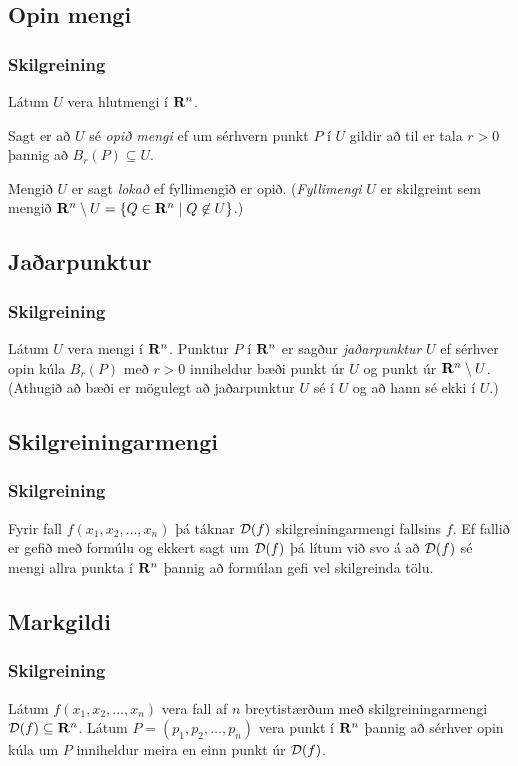  




\subsection{Opin mengi}
 \subsubsection{Skilgreining }
Látum $U$ vera hlutmengi í $\mbox{${\bf R}^n$}$.

Sagt er að $U$ sé {\em opið mengi} ef um sérhvern punkt $P$ í $U$ gildir að til er tala $r>0$ þannig að $B_r(P)\subseteq U$.

Mengið $U$ er sagt {\em lokað} ef fyllimengið er opið.  ({\em Fyllimengi} $U$ er skilgreint sem mengið 
$\mbox{${\bf R}^n$}\setminus U=\{Q\in \mbox{${\bf R}^n$}\mid Q\mbox{$\;\not\in\;$} U\}$.)




\subsection{Jaðarpunktur}
 \subsubsection{Skilgreining }
Látum $U$ vera mengi í $\mbox{${\bf R}^n$}$.  Punktur $P$ í $\mbox{${\bf R}^n$}$ er sagður {\em jaðarpunktur} $U$ ef sérhver opin kúla $B_r(P)$ með $r>0$ inniheldur bæði punkt úr $U$ og punkt úr $\mbox{${\bf R}^n$}\setminus U$.   (Athugið að bæði er mögulegt að jaðarpunktur $U$ sé í $U$ og að hann sé ekki í $U$.)



\subsection{Skilgreiningarmengi}
 \subsubsection{Skilgreining }
Fyrir fall $f(x_1,x_2,\ldots,x_n)$ þá táknar ${\cal D}(f)$ skilgreiningarmengi fallsins $f$.
Ef fallið er gefið með formúlu og ekkert sagt um ${\cal D}(f)$ þá lítum við svo á að ${\cal D}(f)$ sé mengi allra punkta í $\mbox{${\bf R}^n$}$ þannig að formúlan gefi vel skilgreinda tölu.




\subsection{Markgildi}
 \subsubsection{Skilgreining }
Látum $f(x_1,x_2,\ldots,x_n)$ vera fall af
$n$ breytistærðum með skilgreiningarmengi ${\cal D}(f)\subseteq \mbox{${\bf R}^n$}$.
Látum $P=(p_1,p_2,\ldots,p_n)$ vera punkt í $\mbox{${\bf R}^n$}$ þannig að sérhver
opin kúla um $P$ inniheldur meira en einn punkt úr ${\cal D}(f)$. 

